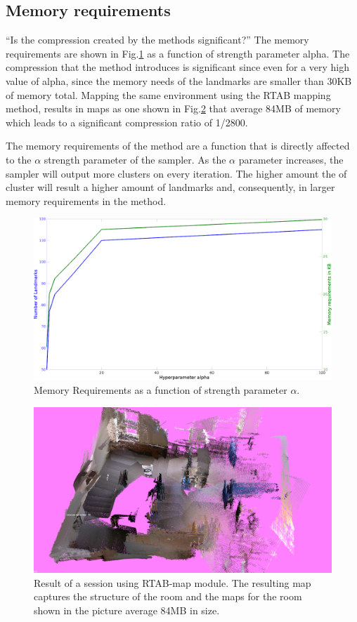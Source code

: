 \documentclass[twoside,hidelinks]{article}
\begin{document}
\subsection{Memory requirements}
\label{reqs}
``Is the compression created by the methods significant?''
The memory requirements are shown in Fig.\ref{memReq} as a function of strength parameter alpha. The compression that the method introduces is significant since even for a very high value of alpha, since the memory needs of the landmarks are smaller than 30KB of memory total. Mapping the same environment using the RTAB mapping method, results in maps  as one shown in Fig.\ref{rtabmap} that average 84MB of memory which leads to a significant compression ratio of 1/2800.

The memory requirements of the method are a function that is directly affected to the $\alpha$ strength parameter of the sampler. As the $\alpha$ parameter increases, the sampler will output more clusters on every iteration. The higher amount the of cluster will result a higher amount of landmarks and, consequently, in larger memory requirements in the method.

\begin{figure}[ht!]
  \centering
    \includegraphics[width=.8\textwidth]{memoryRequirements2}
    \caption{Memory Requirements as a function of strength parameter $\alpha$.}
  \label{memReq}
\end{figure}

\begin{figure}[ht!]
  \centering
    \includegraphics[width=.8\textwidth]{rtabmap}
    \caption{Result of a session using RTAB-map module. The resulting map captures the structure of the room and the maps for the room shown in the picture average 84MB in size.}
  \label{rtabmap}
\end{figure}
\end{document}
